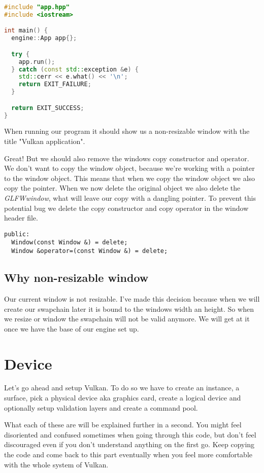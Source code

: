 \documentclass[12pt]{report} \usepackage{preamble}
\begin{document}
\begin{lstlisting}[language=C++]
#include "app.hpp"
#include <iostream>

int main() {
  engine::App app{};

  try {
    app.run();
  } catch (const std::exception &e) {
    std::cerr << e.what() << '\n';
    return EXIT_FAILURE;
  }

  return EXIT_SUCCESS;
}
\end{lstlisting}

When running our program it should show us a non-resizable window with the title "Vulkan application".

Great! But we should also remove the windows copy constructor and operator. We don't want to copy the window object,
because we're working with a pointer to the window object. This means that when we copy the window object
we also copy the pointer. When we now delete the original object we also delete the \textit{GLFWwindow}, what
will leave our copy with a dangling pointer. To prevent this potential bug we delete
the copy constructor and copy operator in the window header file.

\begin{lstlisting}
public:
  Window(const Window &) = delete;
  Window &operator=(const Window &) = delete;
\end{lstlisting}

\subsection{Why non-resizable window}

Our current window is not resizable. I've made this decision because when we will
create our swapchain later it is bound to the windows width an height. So when we
resize or window the swapchain will not be valid anymore. We will get at it once
we have the base of our engine set up.

\section{Device}

Let's go ahead and setup Vulkan. To do so we have to create an instance,
a surface, pick a physical device aka graphics card, create a logical device
and optionally setup validation layers and create a command pool.

What each of these are will be explained further in a second. You might
feel disoriented and confused sometimes when going through this code, but
don't feel discouraged even if you don't understand anything on the first go.
Keep copying the code and come back to this part eventually when you feel more
comfortable with the whole system of Vulkan.
\end{document}
